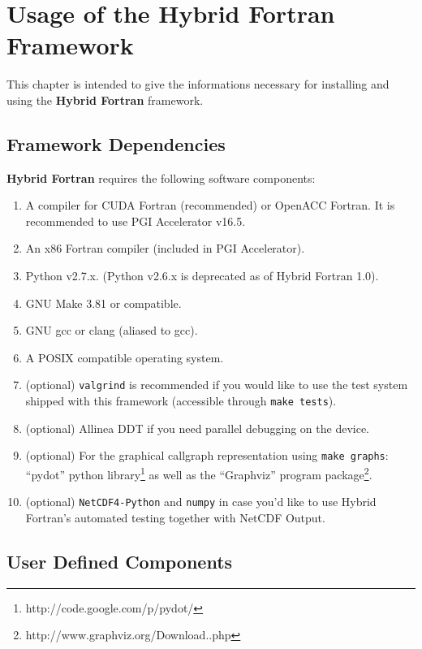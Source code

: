 \chapter{Usage of the Hybrid Fortran Framework} \label{cha:usage}

This chapter is intended to give the informations necessary for installing and using the \textbf{Hybrid Fortran} framework.

\section{Framework Dependencies} \label{sec:dependencies}

\textbf{Hybrid Fortran} requires the following software components:

\begin{enumerate}
 \item A compiler for CUDA Fortran (recommended) or OpenACC Fortran. It is recommended to use PGI Accelerator v16.5.
 \item An x86 Fortran compiler (included in PGI Accelerator).
 \item Python v2.7.x. (Python v2.6.x is deprecated as of Hybrid Fortran 1.0).
 \item GNU Make 3.81 or compatible.
 \item GNU gcc or clang (aliased to gcc).
 \item A POSIX compatible operating system.
 \item (optional) \verb|valgrind| is recommended if you would like to use the test system shipped with this framework (accessible through \verb|make tests|).
 \item (optional) Allinea DDT if you need parallel debugging on the device.
 \item (optional) For the graphical callgraph representation using \verb|make graphs|: ``pydot'' python library\footnote{http://code.google.com/p/pydot/} as well as the ``Graphviz'' program package\footnote{http://www.graphviz.org/Download..php}.
 \item (optional) \verb|NetCDF4-Python| and \verb|numpy| in case you'd like to use Hybrid Fortran's automated testing together with NetCDF Output.
\end{enumerate}

\section{User Defined Components} \label{sub:userDefined}

